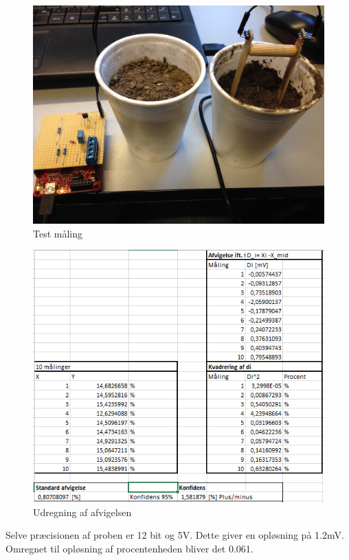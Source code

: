 \begin{figure}[H]
	\centering 
\includegraphics[scale=0.08]{HardwareArkitektur/Sensore/Jordfugt_billeder/test_maling.JPG}
	\caption{Test måling}
	\label{photo:shield}
\end{figure} 

\begin{figure}[H]
	\centering 
\includegraphics[scale=1]{HardwareArkitektur/Sensore/Jordfugt_billeder/afvigelse.PNG}
	\caption{Udregning af afvigelsen}
	\label{photo:shield}
\end{figure} 

Selve præcisionen af proben er 12 bit og 5V. Dette giver en opløsning på 1.2mV. Omregnet til opløsning af procentenheden bliver det 0.061.